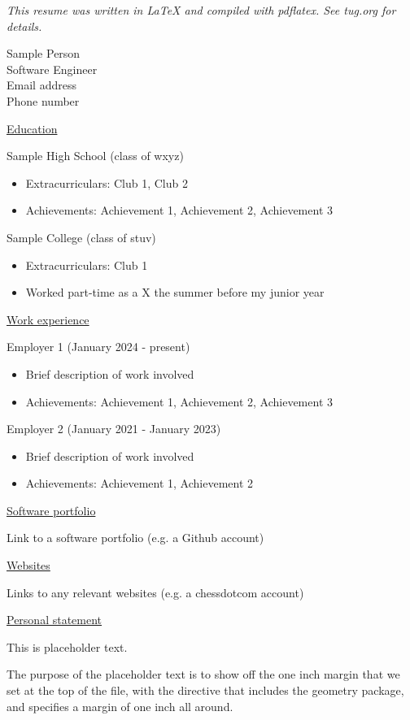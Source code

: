 \documentclass{article}
\begin{document}
\raggedright
\textit{{\small This resume was written in LaTeX and compiled with pdflatex. See tug.org for details.}}

{\small Sample Person \\
Software Engineer \\
Email address \\
Phone number}

\underline{Education}

Sample High School (class of wxyz)
\begin{itemize}
\item Extracurriculars: Club 1, Club 2
\item Achievements: Achievement 1, Achievement 2, Achievement 3
\end{itemize}

Sample College (class of stuv)
\begin{itemize}
\item Extracurriculars: Club 1
\item Worked part-time as a X the summer before my junior year
\end{itemize}

\underline{Work experience}

Employer 1 (January 2024 - present)
\begin{itemize}
\item Brief description of work involved
\item Achievements: Achievement 1, Achievement 2, Achievement 3
\end{itemize}

Employer 2 (January 2021 - January 2023)
\begin{itemize}
\item Brief description of work involved
\item Achievements: Achievement 1, Achievement 2
\end{itemize}

\underline{Software portfolio}

Link to a software portfolio (e.g. a Github account)

\underline{Websites}

Links to any relevant websites (e.g. a chessdotcom account)

\underline{Personal statement}

This is placeholder text.

The purpose of the placeholder text is to show off the one inch margin that we set at the top of the file, with the directive that includes the geometry package, and specifies a margin of one inch all around.
\end{document}
